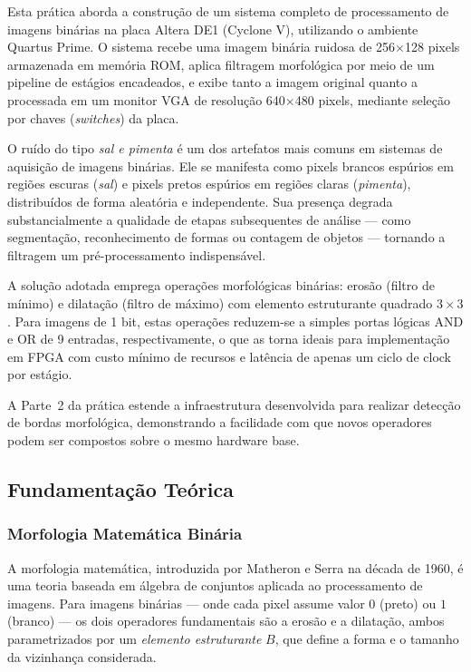 \documentclass[12pt, a4paper]{article}
\begin{document}
	Esta prática aborda a construção de um sistema completo de processamento de imagens
	binárias na placa Altera DE1 (Cyclone V), utilizando o ambiente Quartus Prime.
	O sistema recebe uma imagem binária ruidosa de 256$\times$128 pixels armazenada
	em memória ROM, aplica filtragem morfológica por meio de um pipeline de estágios
	encadeados, e exibe tanto a imagem original quanto a processada em um monitor VGA
	de resolução 640$\times$480 pixels, mediante seleção por chaves (\textit{switches})
	da placa.
	
	O ruído do tipo \textit{sal e pimenta} é um dos artefatos mais comuns em sistemas
	de aquisição de imagens binárias. Ele se manifesta como pixels brancos espúrios em
	regiões escuras (\textit{sal}) e pixels pretos espúrios em regiões claras
	(\textit{pimenta}), distribuídos de forma aleatória e independente. Sua presença
	degrada substancialmente a qualidade de etapas subsequentes de análise --- como
	segmentação, reconhecimento de formas ou contagem de objetos --- tornando a
	filtragem um pré-processamento indispensável.
	
	A solução adotada emprega operações morfológicas binárias: erosão (filtro de
	mínimo) e dilatação (filtro de máximo) com elemento estruturante quadrado
	$3\times3$. Para imagens de 1 bit, estas operações reduzem-se a simples portas
	lógicas AND e OR de 9 entradas, respectivamente, o que as torna ideais para
	implementação em FPGA com custo mínimo de recursos e latência de apenas um ciclo
	de clock por estágio.
	
	A Parte~2 da prática estende a infraestrutura desenvolvida para realizar detecção
	de bordas morfológica, demonstrando a facilidade com que novos operadores podem
	ser compostos sobre o mesmo hardware base.
	
	\subsection{Fundamentação Teórica}
	
	\subsubsection{Morfologia Matemática Binária}
	
	A morfologia matemática, introduzida por Matheron e Serra na década de 1960, é
	uma teoria baseada em álgebra de conjuntos aplicada ao processamento de imagens.
	Para imagens binárias --- onde cada pixel assume valor $0$ (preto) ou $1$ (branco)
	--- os dois operadores fundamentais são a erosão e a dilatação, ambos parametrizados
	por um \textit{elemento estruturante} $B$, que define a forma e o tamanho da
	vizinhança considerada.
	
\end{document}
